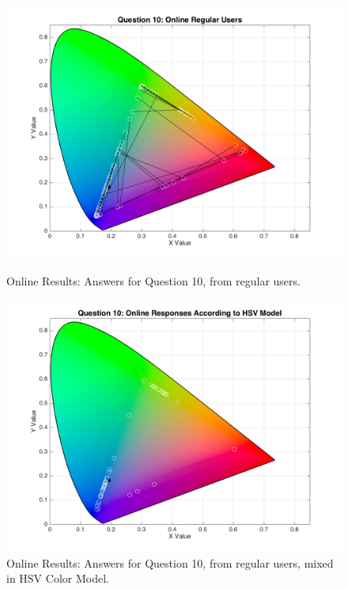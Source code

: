 \begin{figure}[htbp]
  \centering
  \begin{minipage}{0.48\textwidth}
    \centering
    \includegraphics[width=\textwidth]{images/10_online_regularUsers.png}
    \caption[Online Results: Answers for Question 10, from regular users.]{Online Results: Answers for Question 10, from regular users.}
    \label{fig:onlineregular_10}
  \end{minipage}\hfill
  \begin{minipage}{0.48\textwidth}
    \centering
    \includegraphics[width=\textwidth]{images/10_online_HSVresponses.png}
    \caption[Online Results: Answers for Question 10, from regular users, mixed in HSV Color Model.]{Online Results: Answers for Question 10, from regular users, mixed in HSV Color Model.}
    \label{fig:onlinehsvregular_10}
  \end{minipage}
\end{figure}
%
